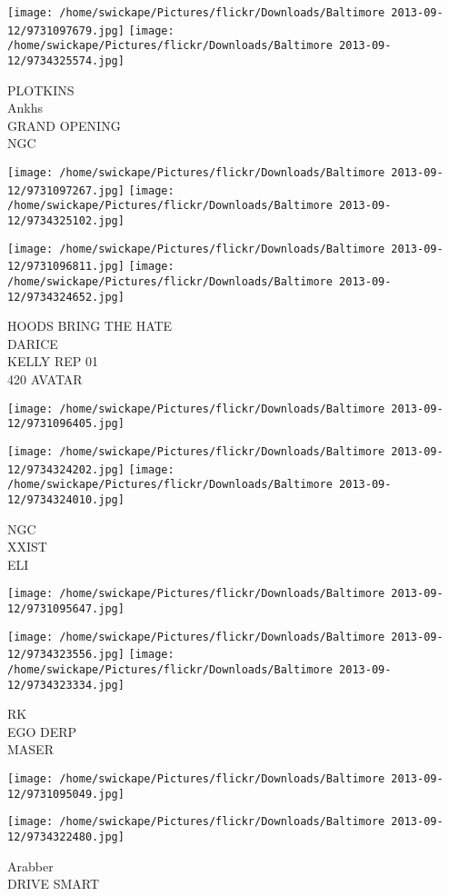 \documentclass[10pt,letterpaper]{article}
\begin{document}
\texttt{[image: /home/swickape/Pictures/flickr/Downloads/Baltimore 2013-09-12/9731097679.jpg]}
\texttt{[image: /home/swickape/Pictures/flickr/Downloads/Baltimore 2013-09-12/9734325574.jpg]}

PLOTKINS\\
Ankhs\\
GRAND OPENING\\
NGC
\pagebreak

\texttt{[image: /home/swickape/Pictures/flickr/Downloads/Baltimore 2013-09-12/9731097267.jpg]}
\texttt{[image: /home/swickape/Pictures/flickr/Downloads/Baltimore 2013-09-12/9734325102.jpg]}

\texttt{[image: /home/swickape/Pictures/flickr/Downloads/Baltimore 2013-09-12/9731096811.jpg]}
\texttt{[image: /home/swickape/Pictures/flickr/Downloads/Baltimore 2013-09-12/9734324652.jpg]}

HOODS BRING THE HATE\\
DARICE\\
KELLY REP 01\\
420 AVATAR
\pagebreak

\texttt{[image: /home/swickape/Pictures/flickr/Downloads/Baltimore 2013-09-12/9731096405.jpg]}

\vspace{0.25in}
\texttt{[image: /home/swickape/Pictures/flickr/Downloads/Baltimore 2013-09-12/9734324202.jpg]}
\texttt{[image: /home/swickape/Pictures/flickr/Downloads/Baltimore 2013-09-12/9734324010.jpg]}

NGC\\
XXIST\\
ELI
\pagebreak

\texttt{[image: /home/swickape/Pictures/flickr/Downloads/Baltimore 2013-09-12/9731095647.jpg]}

\vspace{0.25in}
\texttt{[image: /home/swickape/Pictures/flickr/Downloads/Baltimore 2013-09-12/9734323556.jpg]}
\texttt{[image: /home/swickape/Pictures/flickr/Downloads/Baltimore 2013-09-12/9734323334.jpg]}

RK\\
EGO DERP\\
MASER
\pagebreak

\texttt{[image: /home/swickape/Pictures/flickr/Downloads/Baltimore 2013-09-12/9731095049.jpg]}

\vspace{0.25in}
\texttt{[image: /home/swickape/Pictures/flickr/Downloads/Baltimore 2013-09-12/9734322480.jpg]}

Arabber\\
DRIVE SMART
\pagebreak
\end{document}
